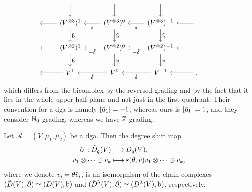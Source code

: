 \documentclass[\MainFolder/Text.tex]{subfiles}
\begin{document}
$$\begin{tikzcd}
{} & \arrow{d} &\arrow{d} & \arrow{d} & {} & {} \\
{} &\arrow{l} \arrow{d}{\tilde{\Hd}} (V^{\otimes 3})^1 & \arrow{l}{\tilde{\delta}} \arrow{d}{\tilde{\Hd}} (V^{\otimes 3})^0 & \arrow{l}{\tilde{\delta}} \arrow{d}{\tilde{\Hd}} (V^{\otimes 3})^{-1} & \arrow{l} & {} \\
{} &\arrow{l} \arrow{d}{\tilde{\Hd}} (V^{\otimes 2})^1 & \arrow{l}{-\tilde{\delta}} \arrow{d}{\tilde{\Hd}} (V^{\otimes 2})^0 & \arrow{l}{-\tilde{\delta}} \arrow{d}{\tilde{\Hd}} (V^{\otimes 2})^{-1} & \arrow{l} & {} \\
{} &\arrow{l} V^1 & \arrow{l}{\tilde{\delta}} V^0 & \arrow{l}{\tilde{\delta}} V^{-1} & \arrow{l}, & {} 
\end{tikzcd}$$
which differs from the bicomplex \cite[Equation (5.3.2.1)]{LodayCyclic} by the reversed grading and by the fact that it lies in the whole upper half-plane and not just in the first quadrant. Their convention for a dga is namely $|\tilde{\mu}_1| = -1$, whereas ours is $|\tilde{\mu}_1|=1$, and they consider $\mathbb{N}_0$-grading, whereas we have $\mathbb{Z}$-grading. 

\begin{Proposition} \label{Prop:DGA}
Let $\mathcal{A} = (V,\mu_1,\mu_2)$ be a dga. Then the degree shift map
$$ \begin{aligned} 
 U: \tilde{D}_q (V) & \longrightarrow D_q(V), \\
        \tilde{v}_1 \otimes \dotsb \otimes \tilde{v}_k & \longmapsto \varepsilon(\theta, \tilde{v}) v_1 \otimes \dotsb \otimes v_k,  \end{aligned}$$
where we denote $v_i = \theta \tilde{v}_i$, is an isomorphism of the chain complexes $(\tilde{D}(V),\tilde{\partial}) \simeq (D(V), \mathrm{b})$ and $(\tilde{D}^\lambda(V),\tilde{\partial})\simeq (D^\lambda(V),\mathrm{b})$, respectively.
\end{Proposition}
   
\end{document}
